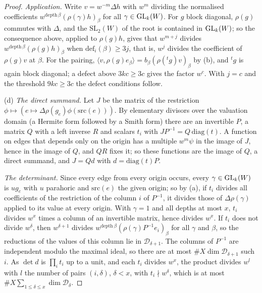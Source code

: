 \begin{proof}
\emph{Application.} Write $v=w^{-m}\Delta h$ with $w^m$ dividing the normalised coefficients $w^{\mathrm{depth}\,\beta}(\rho(\gamma)h)_\beta$ for all $\gamma\in\operatorname{GL}_k(W)$. For $g$ block diagonal, $\rho(g)$ commutes with $\Delta$, and the $\mathrm{SL}_2(W)$ of the root is contained in $\operatorname{GL}_k(W)$; so the consequence above, applied to $\rho(g)h$, gives that $w^{m+j}$ divides $w^{\mathrm{depth}\,\beta}(\rho(g)h)_\beta$ when $\mathrm{def}_i(\beta)\ge3j$,
that is, $w^j$ divides the coefficient of $\rho(g)v$ at $\beta$. For the pairing, $\langle v,\rho(g)e_\beta\rangle=b_\beta(\rho({}^tg)v)_\beta$ by (b), and ${}^tg$ is again block diagonal; a defect above $3kc\ge3c$ gives the factor $w^c$. With $j=c$ and the threshold $9kc\ge3c$ the defect conditions follow.

(d) \emph{The direct summand.} Let $J$ be the matrix of the restriction $\phi\mapsto(e\mapsto\Delta\rho(g_e)\phi(\mathrm{src}(e)))$. By elementary divisors over the valuation domain (a Hermite form followed by a Smith form) there are an invertible $P$, a matrix $Q$ with a left inverse $R$ and scalars $t_i$ with $JP^{-1}=Q\,\mathrm{diag}(t)$. A function on edges that depends only on the origin has a multiple $w^m\psi$ in the image of $J$, hence in the image of $Q$,
and $QR$ fixes it; so these functions are the image of $Q$, a direct summand, and $J=Qd$ with $d=\mathrm{diag}(t)P$.

\emph{The determinant.} Since every edge from every origin occurs, every $\gamma\in\operatorname{GL}_k(W)$ is $ug_e$ with $u$ parahoric and $\mathrm{src}(e)$ the given origin; so by (a), if $t_i$ divides all coefficients of the restriction of the column $i$ of $P^{-1}$, it divides those of $\Delta\rho(\gamma)$ applied to its value at every origin. With $\gamma=1$ and all depths at most $x$, $t_i$ divides $w^x$ times a column
of an invertible matrix, hence divides $w^x$. If $t_i$ does not divide $w^\delta$, then $w^{\delta+1}$ divides $w^{\mathrm{depth}\,\beta}(\rho(\gamma)P^{-1}e_i)_\beta$ for all $\gamma$ and $\beta$, so the reductions of the values of this column lie in $\mathcal D_{\delta+1}$. The columns of $P^{-1}$ are independent modulo the maximal ideal, so there are at most $\#X\dim\mathcal D_{\delta+1}$ such $i$. As
$\det d$ is $\prod_it_i$ up to a unit, and each $t_i$ divides $w^{x}$, the product divides $w^l$ with $l$ the number of pairs $(i,\delta)$, $\delta<x$, with $t_i\nmid w^\delta$, which is at most $\#X\sum_{1\le\delta\le x}\dim\mathcal D_\delta$.
\end{proof}

